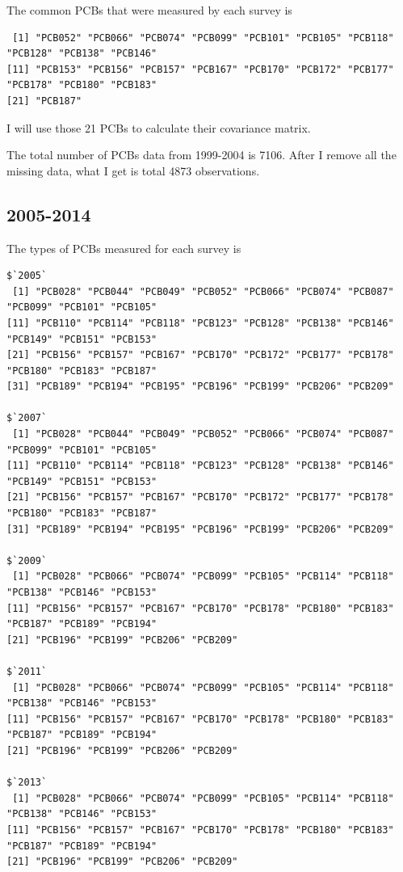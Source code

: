 \documentclass[]{article}
\begin{document}
The common PCBs that were measured by each survey is

\begin{verbatim}
 [1] "PCB052" "PCB066" "PCB074" "PCB099" "PCB101" "PCB105" "PCB118" "PCB128" "PCB138" "PCB146"
[11] "PCB153" "PCB156" "PCB157" "PCB167" "PCB170" "PCB172" "PCB177" "PCB178" "PCB180" "PCB183"
[21] "PCB187"
\end{verbatim}

I will use those 21 PCBs to calculate their covariance matrix.

The total number of PCBs data from 1999-2004 is 7106. After I remove all
the missing data, what I get is total 4873 observations.

\subsection{2005-2014}\label{section-1}

The types of PCBs measured for each survey is

\begin{verbatim}
$`2005`
 [1] "PCB028" "PCB044" "PCB049" "PCB052" "PCB066" "PCB074" "PCB087" "PCB099" "PCB101" "PCB105"
[11] "PCB110" "PCB114" "PCB118" "PCB123" "PCB128" "PCB138" "PCB146" "PCB149" "PCB151" "PCB153"
[21] "PCB156" "PCB157" "PCB167" "PCB170" "PCB172" "PCB177" "PCB178" "PCB180" "PCB183" "PCB187"
[31] "PCB189" "PCB194" "PCB195" "PCB196" "PCB199" "PCB206" "PCB209"

$`2007`
 [1] "PCB028" "PCB044" "PCB049" "PCB052" "PCB066" "PCB074" "PCB087" "PCB099" "PCB101" "PCB105"
[11] "PCB110" "PCB114" "PCB118" "PCB123" "PCB128" "PCB138" "PCB146" "PCB149" "PCB151" "PCB153"
[21] "PCB156" "PCB157" "PCB167" "PCB170" "PCB172" "PCB177" "PCB178" "PCB180" "PCB183" "PCB187"
[31] "PCB189" "PCB194" "PCB195" "PCB196" "PCB199" "PCB206" "PCB209"

$`2009`
 [1] "PCB028" "PCB066" "PCB074" "PCB099" "PCB105" "PCB114" "PCB118" "PCB138" "PCB146" "PCB153"
[11] "PCB156" "PCB157" "PCB167" "PCB170" "PCB178" "PCB180" "PCB183" "PCB187" "PCB189" "PCB194"
[21] "PCB196" "PCB199" "PCB206" "PCB209"

$`2011`
 [1] "PCB028" "PCB066" "PCB074" "PCB099" "PCB105" "PCB114" "PCB118" "PCB138" "PCB146" "PCB153"
[11] "PCB156" "PCB157" "PCB167" "PCB170" "PCB178" "PCB180" "PCB183" "PCB187" "PCB189" "PCB194"
[21] "PCB196" "PCB199" "PCB206" "PCB209"

$`2013`
 [1] "PCB028" "PCB066" "PCB074" "PCB099" "PCB105" "PCB114" "PCB118" "PCB138" "PCB146" "PCB153"
[11] "PCB156" "PCB157" "PCB167" "PCB170" "PCB178" "PCB180" "PCB183" "PCB187" "PCB189" "PCB194"
[21] "PCB196" "PCB199" "PCB206" "PCB209"
\end{verbatim}
\end{document}

